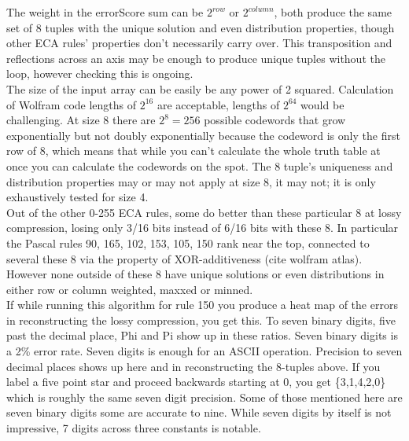 \documentclass[11pt]{article}
\begin{document}
The weight in the errorScore sum can be $2^{row}$ or $2^{column}$, both produce the same set of 8 tuples with the unique solution and even distribution properties, though other ECA rules' properties don't necessarily carry over. This transposition and reflections across an axis may be enough to produce unique tuples without the loop, however checking this is ongoing.\\

The size of the input array can be easily be any power of 2 squared. Calculation of Wolfram code lengths of $2^{16}$ are acceptable, lengths of $2^{64}$ would be challenging. At size 8 there are $2^8=256$ possible codewords that grow exponentially but not doubly exponentially because the codeword is only the first row of 8, which means that while you can't calculate the whole truth table at once you can calculate the codewords on the spot. The 8 tuple's uniqueness and distribution properties may or may not apply at size 8, it may not; it is only exhaustively tested for size 4.\\

Out of the other 0-255 ECA rules, some do better than these particular 8 at lossy compression, losing only 3/16 bits instead of 6/16 bits with these 8. In particular the Pascal rules 90, 165, 102, 153, 105, 150 rank near the top, connected to several these 8 via the property of XOR-additiveness (cite wolfram atlas). However none outside of these 8 have unique solutions or even distributions in either row or column weighted, maxxed or minned.\\

If while running this algorithm for rule 150 you produce a heat map of the errors in reconstructing the lossy compression, you get this. To seven binary digits, five past the decimal place, Phi and Pi show up in these ratios. Seven binary digits is a 2\% error rate. Seven digits is enough for an ASCII operation. Precision to seven decimal places shows up here and in reconstructing the 8-tuples above. If you label a five point star and proceed backwards starting at 0, you get \{3,1,4,2,0\} which is roughly the same seven digit precision. Some of those mentioned here are seven binary digits some are accurate to nine. While seven digits by itself is not impressive, 7 digits across three constants is notable.\\
\end{document}
